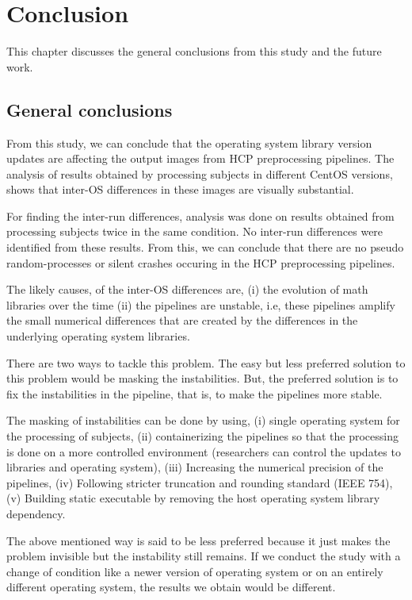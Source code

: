 \chapter{Conclusion}\label{conclusion}
This chapter discusses the general conclusions from this study and the future work.

\section{General conclusions}
From this study, we can conclude that the operating system library version updates are affecting the output images from HCP preprocessing pipelines. The analysis of results obtained by processing subjects in different CentOS versions, shows that inter-OS differences in these images are visually substantial.

For finding the inter-run differences, analysis was done on results obtained from processing subjects twice in the same condition. No inter-run differences were identified from these results. From this, we can conclude that there are no pseudo random-processes or silent crashes occuring in the HCP preprocessing pipelines.

The likely causes, of the inter-OS differences are, (i) the evolution of math libraries over the time (ii) the pipelines are unstable, i.e, these pipelines amplify the small numerical differences that are created by the differences in the underlying operating system libraries.

There are two ways to tackle this problem. The easy but less preferred solution to this problem would be masking the instabilities. But, the preferred solution is to fix the instabilities in the pipeline, that is, to make the pipelines more stable.

The masking of instabilities can be done by using, (i) single operating system for the processing of subjects, (ii) containerizing the pipelines so that the processing is done on a more controlled environment (researchers can control the updates to libraries and operating system), (iii) Increasing the numerical precision of the pipelines, (iv) Following stricter truncation and rounding standard (IEEE 754), (v) Building static executable by removing the host operating system library dependency.

The above mentioned way is said to be less preferred because it just makes the problem invisible but the instability still remains. If we conduct the study with a change of condition like a newer version of operating system or on an entirely different operating system, the results we obtain would be different.

